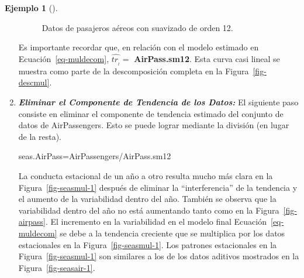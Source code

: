 \documentclass[
  us-letterpaper,
]{scrreprt}
\newenvironment{Shaded}{\begin{snugshade}}{\end{snugshade}}
\newcommand{\NormalTok}[1]{\textcolor[rgb]{0.00,0.23,0.31}{#1}}
\newcommand{\OtherTok}[1]{\textcolor[rgb]{0.00,0.23,0.31}{#1}}
\newcommand{\SpecialCharTok}[1]{\textcolor[rgb]{0.37,0.37,0.37}{#1}}
\theoremstyle{definition}
\newtheorem{example}{Ejemplo}[chapter]
\theoremstyle{plain}
\theoremstyle{plain}
\theoremstyle{definition}
\theoremstyle{remark}
\begin{document}
\begin{example}[]
\begin{tcolorbox}
\begin{enumerate}
\begin{figure}[H]
{  }

  \caption{\label{fig-smap}Datos de pasajeros aéreos con suavizado de
  orden 12.}

  \end{figure}%

  Es importante recordar que, en relación con el modelo estimado en
  Ecuación~\ref{eq-muldecom}, \(\hat{tr_{_t}} =\) \textbf{AirPass.sm12}.
  Esta curva casi lineal se muestra como parte de la descomposición
  completa en la Figura~\ref{fig-descmul}.
\item
  \textbf{\emph{Eliminar el Componente de Tendencia de los Datos:}} El
  siguiente paso consiste en eliminar el componente de tendencia
  estimado del conjunto de datos de AirPassengers. Esto se puede lograr
  mediante la división (en lugar de la resta).

\begin{Shaded}
\begin{Highlighting}[]
\NormalTok{seas.AirPass}\OtherTok{=}\NormalTok{AirPassengers}\SpecialCharTok{/}\NormalTok{AirPass.sm12}
\end{Highlighting}
\end{Shaded}

  La conducta estacional de un año a otro resulta mucho más clara en la
  Figura~\ref{fig-seasmul-1} después de eliminar la ``interferencia'' de
  la tendencia y el aumento de la variabilidad dentro del año. También
  se observa que la variabilidad dentro del año no está aumentando tanto
  como en la Figura~\ref{fig-airpass}. El incremento en la variabilidad
  en el modelo final Ecuación~\ref{eq-muldecom} se debe a la tendencia
  creciente que se multiplica por los datos estacionales en la
  Figura~\ref{fig-seasmul-1}. Los patrones estacionales en la
  Figura~\ref{fig-seasmul-1} son similares a los de los datos aditivos
  mostrados en la Figura~\ref{fig-seasair-1}.
\end{enumerate}

\begin{figure}[H]

\begin{minipage}{0.50\linewidth}

\end{minipage}
\end{figure}
\end{tcolorbox}
\end{example}
\end{document}
